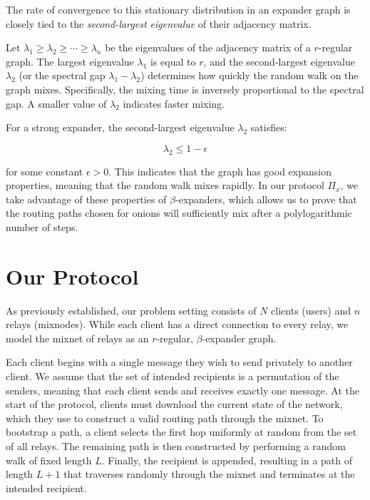 The rate of convergence to this stationary distribution in an expander graph is closely tied to the \textit{second-largest eigenvalue} of their adjacency matrix. 

\begin{definition}  \label{def:second-largest-eig}
    Let $\lambda_1 \geq \lambda_2 \geq \cdots \geq \lambda_n$ be the eigenvalues of the adjacency matrix of a $r$-regular graph. The largest eigenvalue $\lambda_1$ is equal to $r$, and the second-largest eigenvalue $\lambda_2$ (or the spectral gap $\lambda_1 - \lambda_2$) determines how quickly the random walk on the graph mixes. Specifically, the mixing time is inversely proportional to the spectral gap. A smaller value of $\lambda_2$ indicates faster mixing.

For a strong expander, the second-largest eigenvalue $\lambda_2$ satisfies:

$$
\lambda_2 \leq 1 - \epsilon
$$

for some constant $\epsilon > 0$. This indicates that the graph has good expansion properties, meaning that the random walk mixes rapidly. In our protocol $\Pi_x$, we take advantage of these properties of $\beta$-expanders, which allows us to prove that the routing paths chosen for onions will sufficiently mix after a polylogarithmic number of steps.
\end{definition}



\clearpage


\section{Our Protocol}

As previously established, our problem setting consists of $N$ clients (users) and $n$ relays (mixnodes). While each client has a direct connection to every relay, we model the mixnet of relays as an $r$-regular, $\beta$-expander graph.

Each client begins with a single message they wish to send privately to another client. We assume that the set of intended recipients is a permutation of the senders, meaning that each client sends and receives exactly one message. At the start of the protocol, clients must download the current state of the network, which they use to construct a valid routing path through the mixnet. To bootstrap a path, a client selects the first hop uniformly at random from the set of all relays. The remaining path is then constructed by performing a random walk of fixed length $L$. Finally, the recipient is appended, resulting in a path of length $L + 1$ that traverses randomly through the mixnet and terminates at the intended recipient.

